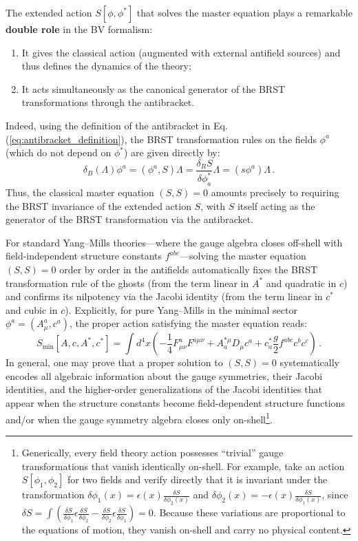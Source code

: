 The extended action \(S[\phi, \phi^*]\) that solves the master equation plays a remarkable \textbf{double role} in the BV formalism:
\begin{enumerate}
    \item[(i)] It gives the classical action (augmented with external antifield sources) and thus defines the dynamics of the theory;
    \item[(ii)] It acts simultaneously as the canonical generator of the BRST transformations through the antibracket.
\end{enumerate}
Indeed, using the definition of the antibracket in Eq. (\ref{eq:antibracket_definition}), the BRST transformation rules on the fields \(\phi^a\) (which do not depend on \(\phi^*\)) are given directly by:
\begin{equation} \label{eq:brst_from_antibracket}
    \delta_B(\Lambda) \phi^a = (\phi^a, S)\Lambda = \frac{\delta_R S}{\delta \phi_a^*} \Lambda = (s\phi^a)\Lambda \, .
\end{equation}
Thus, the classical master equation \((S, S) = 0\) amounts precisely to requiring the BRST invariance of the extended action \(S\), with \(S\) itself acting as the generator of the BRST transformation via the antibracket.

For standard Yang--Mills theories—where the gauge algebra closes off-shell with field-independent structure constants \(f^{abc}\)—solving the master equation \((S,S) = 0\) order by order in the antifields automatically fixes the BRST transformation rule of the ghosts (from the term linear in \(A^*\) and quadratic in \(c\)) and confirms its nilpotency via the Jacobi identity (from the term linear in \(c^*\) and cubic in \(c\)). Explicitly, for pure Yang--Mills in the minimal sector \(\phi^a = (A_\mu^a, c^a)\), the proper action satisfying the master equation reads:
\begin{equation} \label{eq:bv_ym_minimal_solution}
    S_{\text{min}}[A, c, A^*, c^*] = \int d^4x \left( -\frac{1}{4} F_{\mu\nu}^a F^{a\mu\nu} + A_a^{*\mu} D_\mu c^a + c_a^* \frac{g}{2} f^{abc} c^b c^c \right) \, .
\end{equation}
In general, one may prove that a proper solution to \((S,S) = 0\) systematically encodes all algebraic information about the gauge symmetries, their Jacobi identities, and the higher-order generalizations of the Jacobi identities that appear when the structure constants become field-dependent structure functions and/or when the gauge symmetry algebra closes only on-shell\footnote{Generically, every field theory action possesses ``trivial'' gauge transformations that vanish identically on-shell. For example, take an action \(S[\phi_1, \phi_2]\) for two fields and verify directly that it is invariant under the transformation \(\delta \phi_1(x) = \epsilon(x) \frac{\delta S}{\delta \phi_2(x)}\) and \(\delta \phi_2(x) = -\epsilon(x) \frac{\delta S}{\delta \phi_1(x)}\), since \(\delta S = \int \left( \frac{\delta S}{\delta \phi_1} \epsilon \frac{\delta S}{\delta \phi_2} - \frac{\delta S}{\delta \phi_2} \epsilon \frac{\delta S}{\delta \phi_1} \right) = 0\). Because these variations are proportional to the equations of motion, they vanish on-shell and carry no physical content.}.

